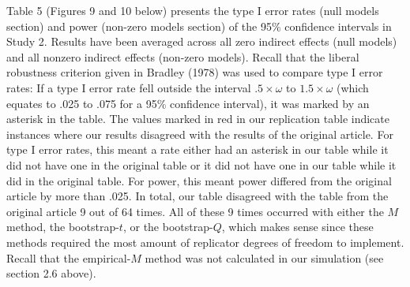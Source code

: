 \documentclass[10,a4paperpaper,]{article}
\begin{document}
Table 5 (Figures 9 and 10 below) presents the type I error rates (null
models section) and power (non-zero models section) of the 95\%
confidence intervals in Study 2. Results have been averaged across all
zero indirect effects (null models) and all nonzero indirect effects
(non-zero models). Recall that the liberal robustness criterion given in
Bradley (1978) was used to compare type I error rates: If a type I error
rate fell outside the interval \(.5 \times \omega\) to
\(1.5 \times \omega\) (which equates to .025 to .075 for a 95\%
confidence interval), it was marked by an asterisk in the table. The
values marked in red in our replication table indicate instances where
our results disagreed with the results of the original article. For type
I error rates, this meant a rate either had an asterisk in our table
while it did not have one in the original table or it did not have one
in our table while it did in the original table. For power, this meant
power differed from the original article by more than .025. In total,
our table disagreed with the table from the original article 9 out of 64
times. All of these 9 times occurred with either the \(M\) method, the
bootstrap-\(t\), or the bootstrap-\(Q\), which makes sense since these
methods required the most amount of replicator degrees of freedom to
implement. Recall that the empirical-\(M\) method was not calculated in
our simulation (see section 2.6 above).
\end{document}
